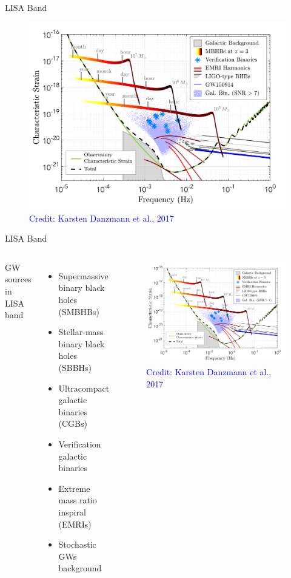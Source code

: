 \documentclass[pdf]{beamer}
\newcommand{\credit}[1]{\tiny{\textcolor{blue}{Credit: #1}}}
\begin{document}
\begin{frame}{LISA Band}
\begin{figure}
\includegraphics[scale=.2]{fig/observedLISA.png}
\caption*{\credit{Karsten Danzmann et al., 2017}}
\end{figure}
\end{frame}

\begin{frame}{LISA Band}
\begin{columns}
\hspace{.5cm}
GW sources in LISA band
\begin{itemize}
\item Supermassive binary black holes (SMBHBs)
\item Stellar-mass binary black holes (SBBHs)
\item Ultracompact galactic binaries (CGBs)
\item Verification galactic binaries
\item Extreme mass ratio inspiral (EMRIs)
\item Stochastic GWs background 
\end{itemize}
\begin{figure}
\includegraphics[width = \textwidth]{fig/observedLISA.png}
\caption*{\credit{Karsten Danzmann et al., 2017}}
\end{figure}
\end{columns}
\end{frame}
\end{document}
